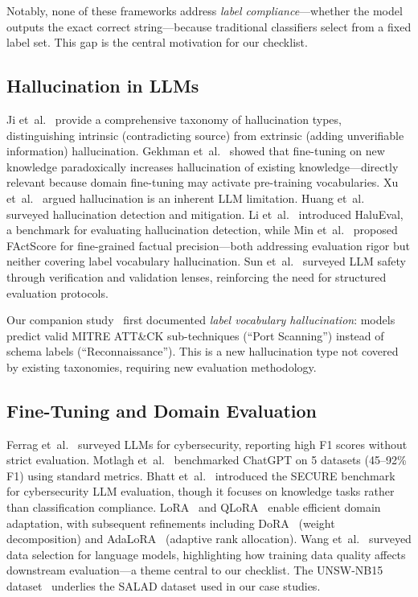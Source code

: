 \documentclass[review,3p]{elsarticle}
\begin{document}
Notably, none of these frameworks address \emph{label compliance}---whether the model outputs the exact correct string---because traditional classifiers select from a fixed label set. This gap is the central motivation for our checklist.

\subsection{Hallucination in LLMs}
Ji et~al.~\cite{ji2023} provide a comprehensive taxonomy of hallucination types, distinguishing intrinsic (contradicting source) from extrinsic (adding unverifiable information) hallucination. Gekhman et~al.~\cite{gekhman2024} showed that fine-tuning on new knowledge paradoxically increases hallucination of existing knowledge---directly relevant because domain fine-tuning may activate pre-training vocabularies. Xu et~al.~\cite{xu2024} argued hallucination is an inherent LLM limitation. Huang et~al.~\cite{huang2023} surveyed hallucination detection and mitigation. Li et~al.~\cite{li2024halueval} introduced HaluEval, a benchmark for evaluating hallucination detection, while Min et~al.~\cite{min2023factscore} proposed FActScore for fine-grained factual precision---both addressing evaluation rigor but neither covering label vocabulary hallucination. Sun et~al.~\cite{sun2024} surveyed LLM safety through verification and validation lenses, reinforcing the need for structured evaluation protocols.

Our companion study~\cite{p3} first documented \emph{label vocabulary hallucination}: models predict valid MITRE ATT\&CK sub-techniques (``Port Scanning'') instead of schema labels (``Reconnaissance''). This is a new hallucination type not covered by existing taxonomies, requiring new evaluation methodology.

\subsection{Fine-Tuning and Domain Evaluation}
Ferrag et~al.~\cite{ferrag2024} surveyed LLMs for cybersecurity, reporting high F1 scores without strict evaluation. Motlagh et~al.~\cite{motlagh2024} benchmarked ChatGPT on 5 datasets (45--92\% F1) using standard metrics. Bhatt et~al.~\cite{secure2024} introduced the SECURE benchmark for cybersecurity LLM evaluation, though it focuses on knowledge tasks rather than classification compliance. LoRA~\cite{hu2022} and QLoRA~\cite{dettmers2023} enable efficient domain adaptation, with subsequent refinements including DoRA~\cite{liu2024dora} (weight decomposition) and AdaLoRA~\cite{zhang2023adalora} (adaptive rank allocation). Wang et~al.~\cite{wang2024} surveyed data selection for language models, highlighting how training data quality affects downstream evaluation---a theme central to our checklist. The UNSW-NB15 dataset~\cite{moustafa2016} underlies the SALAD dataset used in our case studies.
\end{document}
